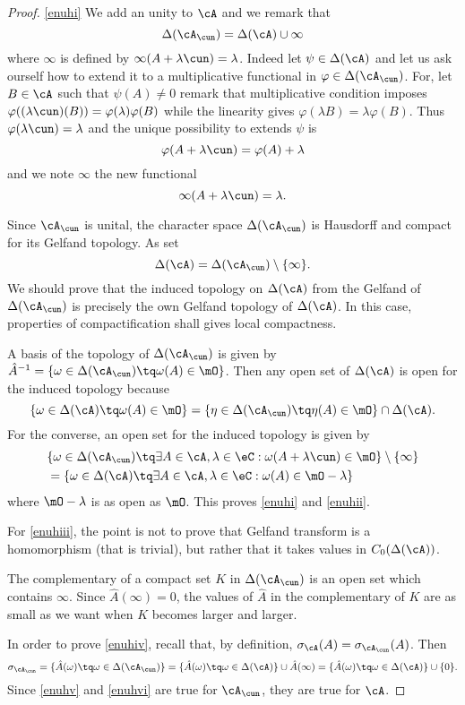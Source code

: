\begin{proof}
\ref{enuhi} We add an unity to $\cA$ and we remark that
\[ 
\Delta(\cA_{\cun})=\Delta(\cA)\cup\infty
\]
where $\infty$ is defined by $\infty(A+\lambda\cun)=\lambda$. Indeed let $\psi\in\Delta(\cA)$ and let us ask ourself how to extend it to a multiplicative functional in $\varphi\in\Delta(\cA_{\cun})$. For, let $B\in\cA$ such that $\psi(A)\neq 0$ remark that multiplicative condition imposes $\varphi( (\lambda\cun)(B) )=\varphi(\lambda)\varphi(B)$ while the linearity gives $\varphi(\lambda B)=\lambda\varphi(B)$. Thus $\varphi(\lambda\cun)=\lambda$ and the unique possibility to extends $\psi$ is
\[ 
\varphi(A+\lambda\cun)=\varphi(A)+\lambda
\]
and we note $\infty$ the new functional
\[ 
\infty(A+\lambda\cun)=\lambda.
\]

Since $\cA_{\cun}$ is unital, the character space $\Delta(\cA_{\cun})$  is Hausdorff and compact for its Gelfand topology. As set
\[ 
  \Delta(\cA)=\Delta(\cA_{\cun})\setminus\{\infty\}.
\]
We should prove that the induced topology on $\Delta(\cA)$ from the Gelfand of $\Delta(\cA_{\cun})$ is precisely the own Gelfand topology of $\Delta(\cA)$. In this case, properties of compactification shall gives local compactness.

A basis of the topology of $\Delta(\cA_{\cun})$ is given by $\hat A^{-1}=\{\omega\in\Delta(\cA_{\cun})\tq\omega(A)\in\mO\}$. Then any open set of $\Delta(\cA)$ is open for the induced topology because
\[ 
\{\omega\in\Delta(\cA)\tq\omega(A)\in\mO\}=\{\eta\in\Delta(\cA_{\cun})\tq\eta(A)\in\mO\}\cap\Delta(\cA).
\]
For the converse, an open set for the induced topology is given by
\[
\begin{split}
&\{\omega\in\Delta(\cA_{\cun})\tq\exists A\in\cA,\lambda\in\eC:\omega(A+\lambda\cun)\in\mO\}\setminus\{\infty\}\\
&=\{\omega\in\Delta(\cA)\tq\exists A\in\cA,\lambda\in\eC:\omega(A)\in\mO-\lambda\}                             
\end{split}
\]
where $\mO-\lambda$ is as open as $\mO$. This proves \ref{enuhi} and \ref{enuhii}.

For \ref{enuhiii}, the point is not to prove that Gelfand transform is a homomorphism (that is trivial), but rather that it takes values in $C_0(\Delta(\cA))$.

The complementary of a compact set $K$ in $\Delta(\cA_{\cun})$ is an open set which contains $\infty$. Since $\hat A(\infty)=0$, the values of $\hat A$ in the complementary of $K$ are as small as we want when $K$ becomes larger and larger.

In order to prove \ref{enuhiv}, recall that, by definition, $\sigma_{\cA}(A)=\sigma_{\cA_{\cun}}(A)$. Then
\begin{equation}
  \sigma_{\cA_{\cun}}=\{\hat A(\omega)\tq\omega\in\Delta(\cA_{\cun})\}
                     =\{\hat A(\omega)\tq \omega\in\Delta(\cA)\}\cup\hat A(\infty)
                     =\{\hat A(\omega)\tq \omega\in\Delta(\cA)\}\cup\{0\}.
\end{equation}
Since \ref{enuhv} and \ref{enuhvi} are true for $\cA_{\cun}$, they are true for $\cA$.
 
\end{proof}

